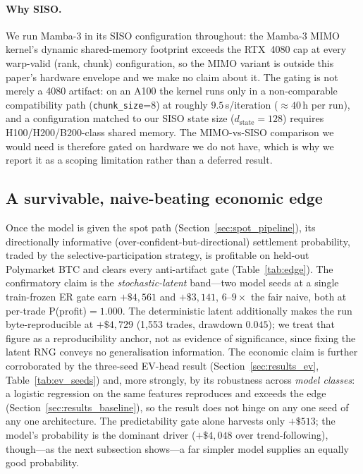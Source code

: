 \documentclass{article}
\begin{document}
\paragraph{Why SISO.}
We run Mamba-3 in its SISO configuration throughout: the Mamba-3 MIMO kernel's
dynamic shared-memory footprint exceeds the RTX~4080 cap at every warp-valid
(rank, chunk) configuration, so the MIMO variant is outside this paper's
hardware envelope and we make no claim about it.  The gating is not merely a
4080 artifact: on an A100 the kernel runs only in a non-comparable compatibility
path (\texttt{chunk\_size}{=}8) at roughly $9.5$\,s/iteration ($\approx 40$\,h
per run), and a configuration matched to our SISO state size ($d_{\mathrm{state}}{=}128$)
requires H100/H200/B200-class shared memory.  The MIMO-vs-SISO comparison we
would need is therefore gated on hardware we do not have, which is why we report
it as a scoping limitation rather than a deferred result.

\subsection{A survivable, naive-beating economic edge}\label{sec:results_edge}

Once the model is given the spot path (Section~\ref{sec:spot_pipeline}),
its directionally informative (over-confident-but-directional) settlement
probability, traded by the selective-participation strategy, is profitable
on held-out Polymarket BTC and clears every anti-artifact gate (Table~\ref{tab:edge}).
The confirmatory claim is the \emph{stochastic-latent} band---two model
seeds at a single train-frozen ER gate earn $+\$4{,}561$ and $+\$3{,}141$,
$6$--$9\times$ the fair naive, both at per-trade P(profit)$=1.000$.  The
deterministic latent additionally makes the run byte-reproducible at
$+\$4{,}729$ (1{,}553 trades, drawdown $0.045$); we treat that figure as a
reproducibility anchor, not as evidence of significance, since fixing the
latent RNG conveys no generalisation information.  The economic claim is
further corroborated by the three-seed EV-head result
(Section~\ref{sec:results_ev}, Table~\ref{tab:ev_seeds}) and, more strongly,
by its robustness across \emph{model classes}: a logistic regression on the
same features reproduces and exceeds the edge
(Section~\ref{sec:results_baseline}), so the result does not hinge on any one
seed of any one architecture.  The predictability gate alone harvests only
$+\$513$; the model's probability is the dominant driver ($+\$4{,}048$ over
trend-following), though---as the next subsection shows---a far simpler model
supplies an equally good probability.
\end{document}
